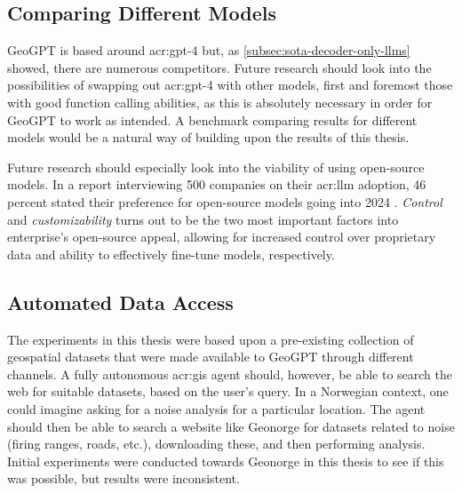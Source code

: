 \subsection{Comparing Different Models}
\label{sec:comparing-different-models}

GeoGPT is based around \acrshort{acr:gpt}-4 but, as \autoref{subsec:sota-decoder-only-llms} showed, there are numerous competitors. Future research should look into the possibilities of swapping out \acrshort{acr:gpt}-4 with other models, first and foremost those with good function calling abilities, as this is absolutely necessary in order for GeoGPT to work as intended. A benchmark comparing results for different models would be a natural way of building upon the results of this thesis.

Future research should especially look into the viability of using open-source models. In a report interviewing 500 companies on their \acrshort{acr:llm} adoption, 46 percent stated their preference for open-source models going into 2024 \citep{wangsarah16ChangesWay2024}. \textit{Control} and \textit{customizability} turns out to be the two most important factors into enterprise's open-source appeal, allowing for increased control over proprietary data and ability to effectively fine-tune models, respectively.

\subsection{Automated Data Access}
\label{sec:automated-data-access}

The experiments in this thesis were based upon a pre-existing collection of geospatial datasets that were made available to GeoGPT through different channels. A fully autonomous \acrshort{acr:gis} agent should, however, be able to search the web for suitable datasets, based on the user's query. In a Norwegian context, one could imagine asking for a noise analysis for a particular location. The agent should then be able to search a website like Geonorge for datasets related to noise (firing ranges, roads, etc.), downloading these, and then performing analysis. Initial experiments were conducted towards Geonorge in this thesis to see if this was possible, but results were inconsistent.